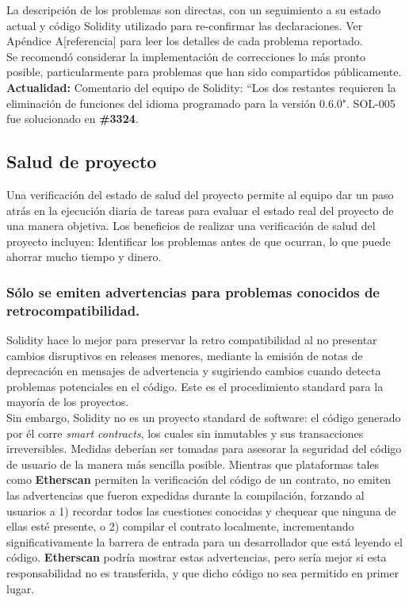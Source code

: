 La descripción de los problemas son directas, con un seguimiento a su estado actual y código Solidity utilizado para re-confirmar las declaraciones. Ver Apéndice A[referencia] para leer los detalles de cada problema reportado.\\

Se recomendó considerar la implementación de correcciones lo más pronto posible, particularmente para problemas que han sido compartidos públicamente.\\

\textbf{Actualidad:} Comentario del equipo de Solidity: ``Los dos restantes requieren la eliminación de funciones del idioma programado para la versión 0.6.0". SOL-005 fue solucionado en \textbf{\#3324}.\\

\subsection{Salud de proyecto}
Una verificación del estado de salud del proyecto permite al equipo dar un paso atrás en la ejecución diaria de tareas para evaluar el estado real del proyecto de una manera objetiva. Los beneficios de realizar una verificación de salud del proyecto incluyen: Identificar los problemas antes de que ocurran, lo que puede ahorrar mucho tiempo y dinero.


\subsubsection{Sólo se emiten advertencias para problemas conocidos de retrocompatibilidad.}
Solidity hace lo mejor para preservar la retro compatibilidad al no presentar cambios disruptivos en releases menores, mediante la emisión de notas de deprecación en mensajes de advertencia y sugiriendo cambios cuando detecta problemas potenciales en el código. Este es el procedimiento standard para la mayoría de los proyectos.\\

Sin embargo, Solidity no es un proyecto standard de software: el código generado por él corre \textit{smart contracts}, los cuales sin inmutables y sus transacciones irreversibles. Medidas deberían ser tomadas para asesorar la seguridad del código de usuario de la manera más sencilla posible. Mientras que plataformas tales como \textbf{Etherscan} permiten la verificación del código de un contrato, no emiten las advertencias que fueron expedidas durante la compilación, forzando al usuarios a 1) recordar todos las cuestiones conocidas y chequear que ninguna de ellas esté presente, o 2) compilar el contrato localmente, incrementando significativamente la barrera de entrada para un desarrollador que está leyendo el código. \textbf{Etherscan} podría mostrar estas advertencias, pero sería mejor si esta responsabilidad no es transferida, y que dicho código no sea permitido en primer lugar.\\

